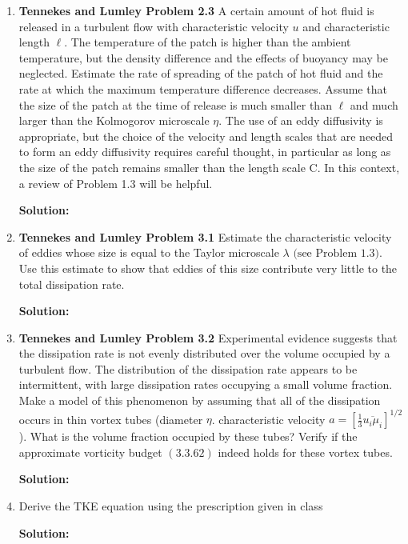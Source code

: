 \documentclass[10pt]{article}
\newenvironment{Solution}
    {\textbf{Solution:}
    
    \vspace{5mm}
    \begin{tcolorbox}
    }
    {
    \end{tcolorbox}
    \vspace{5mm}
    }
\begin{document}

\begin{enumerate}



\item \textbf{Tennekes and Lumley Problem 2.3} A certain amount of hot fluid is released in a turbulent flow with characteristic velocity $u$ and characteristic length $\ell$. The temperature of the patch is higher than the ambient temperature, but the density difference and the effects of buoyancy may be neglected. Estimate the rate of spreading of the patch of hot fluid and the rate at which the maximum temperature difference decreases. Assume that the size of the patch at the time of release is much smaller than $\ell$ and much larger than the Kolmogorov microscale $\eta$. The use of an eddy diffusivity is appropriate, but the choice of the velocity and length scales that are needed to form an eddy diffusivity requires careful thought, in particular as long as the size of the patch remains smaller than the length scale
C. In this context, a review of Problem 1.3 will be helpful.

\begin{Solution}

\end{Solution}
\newpage

\item \textbf{Tennekes and Lumley Problem 3.1} Estimate the characteristic velocity of eddies whose size is equal to the Taylor microscale $\lambda \text { (see Problem } 1.3) .$ Use this estimate to show that eddies of this size contribute very little to the total dissipation rate.


\begin{Solution}


\end{Solution}
\item \textbf{Tennekes and Lumley Problem 3.2} Experimental evidence suggests that the dissipation rate is not evenly distributed over the volume occupied by a turbulent flow. The distribution of the dissipation rate appears to be intermittent, with large dissipation rates occupying a small volume fraction. Make a model of this phenomenon by assuming that all of the dissipation occurs in thin vortex tubes (diameter $\eta$. characteristic velocity $a=\left[\frac{1}{3} \overline{u_{i} \mu_{i}}\right]^{1 / 2}$ ). What is the volume fraction occupied by these tubes? Verify if the approximate vorticity budget $(3.3 .62)$ indeed holds for these vortex tubes.


\begin{Solution}


\end{Solution}

\item Derive the TKE equation using the prescription given in class


\begin{Solution}


\end{Solution}
\end{enumerate}
\end{document}
